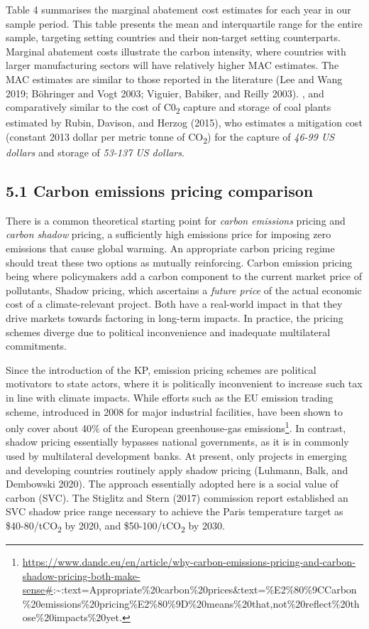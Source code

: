 \documentclass[
  10pt,
]{article}
\begin{document}
Table 4 summarises the marginal abatement cost estimates for each year
in our sample period. This table presents the mean and interquartile
range for the entire sample, targeting setting countries and their
non-target setting counterparts. Marginal abatement costs illustrate the
carbon intensity, where countries with larger manufacturing sectors will
have relatively higher MAC estimates. The MAC estimates are similar to
those reported in the literature (Lee and Wang 2019; Böhringer and Vogt
2003; Viguier, Babiker, and Reilly 2003). , and comparatively similar to
the cost of C0\textsubscript{2} capture and storage of coal plants
estimated by Rubin, Davison, and Herzog (2015), who estimates a
mitigation cost (constant 2013 dollar per metric tonne of
CO\textsubscript{2}) for the capture of \emph{46-99 US dollars} and
storage of \emph{53-137 US dollars}.

\hypertarget{carbon-emissions-pricing-comparison}{%
\subsection{5.1 Carbon emissions pricing
comparison}\label{carbon-emissions-pricing-comparison}}

There is a common theoretical starting point for \emph{carbon emissions}
pricing and \emph{carbon shadow} pricing, a sufficiently high emissions
price for imposing zero emissions that cause global warming. An
appropriate carbon pricing regime should treat these two options as
mutually reinforcing. Carbon emission pricing being where policymakers
add a carbon component to the current market price of pollutants, Shadow
pricing, which ascertains a \emph{future price} of the actual economic
cost of a climate-relevant project. Both have a real-world impact in
that they drive markets towards factoring in long-term impacts. In
practice, the pricing schemes diverge due to political inconvenience and
inadequate multilateral commitments.

Since the introduction of the KP, emission pricing schemes are political
motivators to state actors, where it is politically inconvenient to
increase such tax in line with climate impacts. While efforts such as
the EU emission trading scheme, introduced in 2008 for major industrial
facilities, have been shown to only cover about 40\% of the European
greenhouse-gas emissions\footnote{\url{https://www.dandc.eu/en/article/why-carbon-emissions-pricing-and-carbon-shadow-pricing-both-make-sense\#}:\textasciitilde:text=Appropriate\%20carbon\%20prices\&text=\%E2\%80\%9CCarbon\%20emissions\%20pricing\%E2\%80\%9D\%20means\%20that,not\%20reflect\%20those\%20impacts\%20yet.}.
In contrast, shadow pricing essentially bypasses national governments,
as it is in commonly used by multilateral development banks. At present,
only projects in emerging and developing countries routinely apply
shadow pricing (Luhmann, Balk, and Dembowski 2020). The approach
essentially adopted here is a social value of carbon (SVC). The Stiglitz
and Stern (2017) commission report established an SVC shadow price range
necessary to achieve the Paris temperature target as
\$40-80/tCO\textsubscript{2} by 2020, and \$50-100/tCO\textsubscript{2}
by 2030.
\end{document}

